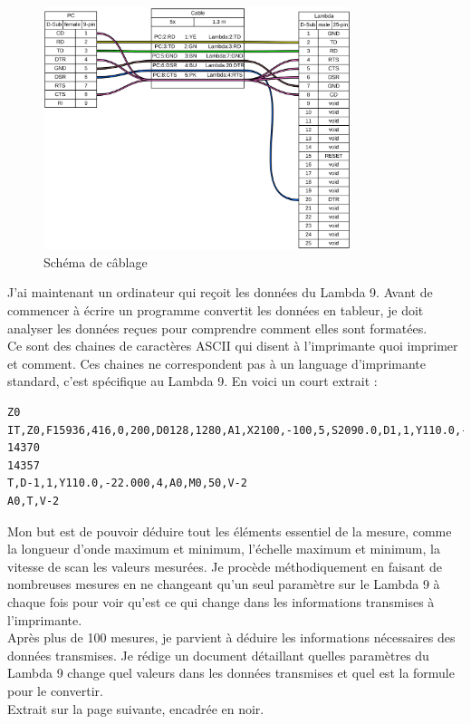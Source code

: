 \documentclass[12pt]{article}
\begin{document}
\begin{figure}[h]
	\centering
	\includegraphics[width=0.8\textwidth]{cableLambda}
	\caption{Schéma de câblage}
	\label{fig:schemaCable}
\end{figure}


\FloatBarrier
J'ai maintenant un ordinateur qui reçoit les données du Lambda 9.
Avant de commencer à écrire un programme convertit les données en tableur, je doit analyser les données reçues pour comprendre comment elles sont formatées.\\
Ce sont des chaines de caractères ASCII qui disent à l'imprimante quoi imprimer et comment.
Ces chaines ne correspondent pas à un language d'imprimante standard, c'est spécifique au Lambda 9.
En voici un court extrait :
\begin{lstlisting}
Z0
IT,Z0,F15936,416,0,200,D0128,1280,A1,X2100,-100,5,S2090.0,D1,1,Y110.0,-22.000,4,Z0,D0128,1280,L1
14370
14357
T,D-1,1,Y110.0,-22.000,4,A0,M0,50,V-2
A0,T,V-2
\end{lstlisting}
Mon but est de pouvoir déduire tout les éléments essentiel de la mesure, comme la longueur d'onde maximum et minimum, l'échelle maximum et minimum, la vitesse de scan les valeurs mesurées.
Je procède méthodiquement en faisant de nombreuses mesures en ne changeant qu'un seul paramètre sur le Lambda 9 à chaque fois pour voir qu'est ce qui change dans les informations transmises à l'imprimante.\\
Après plus de 100 mesures, je parvient à déduire les informations nécessaires des données transmises.
Je rédige un document détaillant quelles paramètres du Lambda 9 change quel valeurs dans les données transmises et quel est la formule pour le convertir.\\
Extrait sur la page suivante, encadrée en noir.
\end{document}

